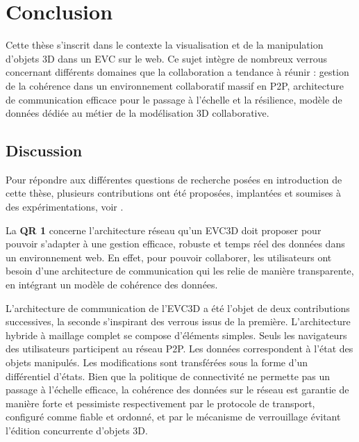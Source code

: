 \chapter{Conclusion}
\chaptertable

Cette thèse s'inscrit dans le contexte la visualisation et de la manipulation d'objets 
3D dans un \gls{EVC} sur le web. Ce sujet intègre de nombreux verrous 
concernant différents domaines que la collaboration a tendance à réunir : gestion 
de la cohérence dans un environnement collaboratif massif en \gls{P2P}, 
architecture de communication efficace pour le passage à l'échelle et la résilience, 
modèle de données dédiée au métier de la modélisation 3D collaborative. 

\section{Discussion}
Pour répondre aux différentes questions de 
recherche posées en introduction de cette thèse, plusieurs contributions ont été 
proposées, implantées et soumises à des expérimentations, voir 
\cite{Desprat2015a,Desprat2015b,Desprat2016,Desprat2017}. 


La \textbf{QR 1} concerne l'architecture réseau qu'un \gls{EVC3D} doit proposer 
pour 
pouvoir s'adapter à une gestion efficace, robuste et temps réel des données dans 
un environnement web. En effet, pour pouvoir collaborer, les utilisateurs ont besoin 
d'une architecture de communication qui les relie de manière transparente, en 
intégrant un modèle de cohérence des données. 

L'architecture de communication de l'\gls{EVC3D} a été l'objet de deux 
contributions successives, la seconde s'inspirant des verrous issus de la 
première. 
L'architecture hybride à maillage complet se compose d'éléments simples. 
Seuls les navigateurs des utilisateurs participent au réseau \gls{P2P}. Les 
données correspondent à l'état des objets manipulés. 
Les modifications sont transférées 
sous la forme d'un différentiel d'états. Bien que la politique de connectivité ne 
permette pas un passage à l'échelle efficace, la cohérence des données sur le 
réseau est garantie de manière forte et pessimiste respectivement par le protocole 
de transport, configuré comme fiable et ordonné, et par le mécanisme de 
verrouillage évitant l'édition concurrente d'objets 3D.

